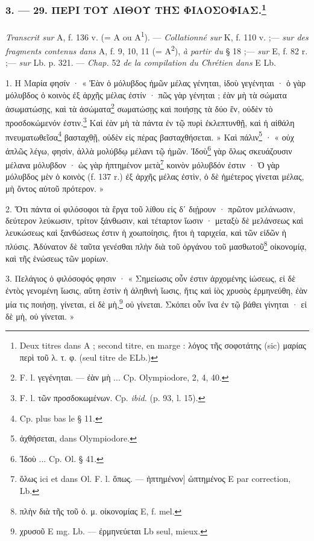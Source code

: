 \documentclass[a4paper, 11pt, oneside, polutonikogreek, french]{article}
\begin{document}
\bigskip
\centerline{\EightStarTaper}
\centerline{\EightStarTaper\EightStarTaper}
\bigskip

\subsubsection[3. --- 29. ΠΕΡΙ ΤΟΥ ΛΙΘΟΥ ΤΗΣ ΦΙΛΟΣΟΦΙΑΣ.]{3. --- 29. ΠΕΡΙ ΤΟΥ ΛΙΘΟΥ ΤΗΣ ΦΙΛΟΣΟΦΙΑΣ.\footnote{Deux titres dans A ; second titre, en marge : λόγος τῆς σοφοτάτης (sic) μαρίας περὶ τοῦ λ. τ. φ. (seul titre de ELb.)}}
\paragraph{}
\emph{Transcrit sur} A, f. 136 v. (= A ou A\textsuperscript{1}). --- \emph{Collationné sur} K, f. 110 v. ;--- \emph{sur des fragments contenus dans} A, f. 9, 10, 11 (= A\textsuperscript{2}), \emph{à partir du} § 18 ;--- \emph{sur} E, f. 82 r. ;--- \emph{sur} Lb. p. 321. --- \emph{Chap.} 52 \emph{de la compilation du Chrétien dans} E Lb.

\bigskip

1. Η Μαρία φησίν · « Ἐὰν ὁ μόλυβδος ἡμῶν μέλας γένηται, ἰδοὺ γεγένηται · ὁ γὰρ μόλυβδος ὁ κοινὸς ἐξ ἀρχῆς μέλας ἐστίν · πῶς γὰρ γένηται ; ἐὰν μὴ τὰ σώματα ἀσωματώσῃς, καὶ τὰ ἀσώματα\footnote{F. l. γεγένηται. --- ἐὰν μὴ ... Cp. Olympiodore, 2, 4, 40.} σωματώσῃς καὶ ποιήσῃς τὰ δύο ἓν, οὐδὲν τὸ προσδοκώμενόν ἐστιν.\footnote{F. l. τῶν προσδοκωμένων. Cp. \emph{ibid.} (p. 93, l. 15).} Καὶ ἐὰν μὴ τὰ πάντα ἐν τῷ πυρὶ ἐκλεπτυνθῇ, καὶ ἡ αἰθάλη πνευματωθεῖσα\footnote{Cp. plus bas le § 11.} βασταχθῇ, οὐδὲν εἰς πέρας βασταχθήσεται. » Καὶ πάλιν\footnote{ἀχθήσεται, dans Olympiodore.} · « οὐχ ἀπλῶς λέγω, φησὶν, ἀλλὰ μολύβδῳ μέλανι τῷ ἡμῶν. Ἰδοὺ\footnote{Ἰδοὺ ... Cp. Ol. § 41.} γὰρ ὅλως σκευάζουσιν μέλανα μόλυβδον · ὡς γὰρ ἠπτημένον μετὰ\footnote{ὅλως ici et dans Ol. F. l. ὅπως. --- ἠπτημένον] ὠπτημένος E par correction, Lb.} κοινὸν μόλυβδόν ἐστιν · Ὁ γὰρ μόλυβδος μὲν ὁ κοινὸς (f. 137 r.) ἐξ ἀρχῆς μέλας ἐστὶν, ὁ δὲ ἡμέτερος γίνεται μέλας, μὴ ὄντος αὐτοῦ πρότερον. »

2. Ὅτι πάντα οἱ φιλόσοφοι τὰ ἔργα τοῦ λίθου εἰς δʹ διῄρουν · πρῶτον μελάνωσιν, δεύτερον λεύκωσιν, τρίτον ξάνθωσιν, καὶ τέταρτον ἴωσιν · μεταξὺ δὲ μελάνσεως καὶ λευκώσεως καὶ ξανθώσεως ἐστιν ἡ χοωποίησις, ἤτοι ἡ ταριχεία, καὶ τῶν εἰδῶν ἡ πλύσις. Ἀδύνατον δὲ ταῦτα γενέσθαι πλὴν διὰ τοῦ ὀργάνου τοῦ μασθωτοῦ\footnote{πλὴν διὰ τῆς τοῦ ὀ. μ. οἰκονομίας E, f. mel.} οἰκονομίᾳ, καὶ τῆς ἑνώσεως τῶν μορίων.

3. Πελάγιος ὁ φιλόσοφός φησιν · « Σημείωσις οὖν ἐστιν ἀρχομένης ἰώσεως, εἰ δὲ ἐντὸς γενομένη ἴωσις, αὕτη ἐστὶν ἡ ἀληθινὴ ἴωσις, ἥτις καὶ ἰὸς χρυσὸς ἑρμηνεύθη, ἐὰν μία τις ποιήσῃ, γίνεται, εἰ δὲ μὴ,\footnote{χρυσοῦ E mg. Lb. --- ἐρμηνεύεται Lb seul, mieux.} οὐ γίνεται. Σκόπει οὖν ἵνα ἐν τῷ βάθει γίνηται · εἰ δὲ μὴ, οὐ γίνεται. »
\end{document}
